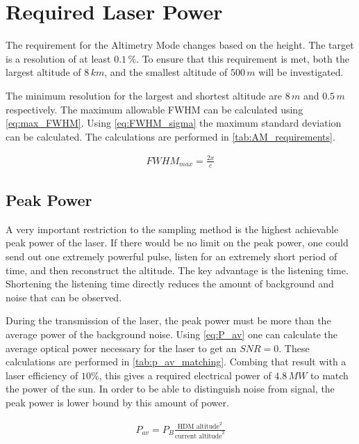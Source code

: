 \section{Required Laser Power} 
\label{ssec:required_laser_power}
The requirement for the Altimetry Mode changes based on the height. The target is a resolution of at least $0.1\,\%$. To ensure that this requirement is met, both the largest altitude of $8\,km$, and the smallest altitude of $500\,m$ will be investigated.

The minimum resolution for the largest and shortest altitude are $8\,m$ and $0.5\,m$ respectively. The maximum allowable FWHM can be calculated using \cref{eq:max_FWHM}.
 Using \cref{eq:FWHM_sigma} the maximum standard deviation can be calculated. The calculations are performed in \cref{tab:AM_requirements}.

\begin{align}\label{eq:max_FWHM}
FWHM_{max} = \frac{2x}{c}
\end{align}



\subsection{Peak Power}
A very important restriction to the sampling method is the highest achievable peak power of the laser. If there would be no limit on the peak power, one could send out one extremely powerful pulse, listen for an extremely short period of time, and then reconstruct the altitude. The key advantage is the listening time. Shortening the listening time directly reduces the amount of background and noise that can be observed. 

During the transmission of the laser, the peak power must be more than the average power of the background noise. Using \cref{eq:P_av} one can calculate the average optical power necessary for the laser to get an $SNR=0$. These calculations are performed in \cref{tab:p_av_matching}. Combing that result with a laser efficiency of $10\%$, this gives a required electrical power of $4.8\,MW$ to match the power of the sun. In order to be able to distinguish noise from signal, the peak power is lower bound by this amount of power.

\begin{align}\label{eq:P_av}
P_{av} = P_B\frac{\text{HDM altitude}^2}{\text{current altitude}^2}
\end{align} 



